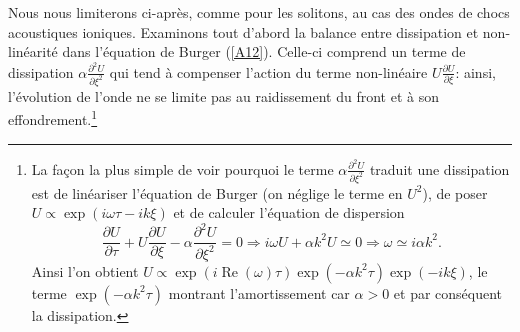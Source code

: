 \documentclass[10pt,thmsa]{article}
\begin{document}
Nous nous limiterons ci-apr\`{e}s, comme pour les solitons, au cas des ondes
de chocs acoustiques ioniques. Examinons tout d'abord la balance entre
dissipation et non-lin\'{e}arit\'{e} dans l'\'{e}quation de Burger
(\ref{A12}). Celle-ci comprend un terme de dissipation $\alpha\frac
{\partial^{2}U}{\partial\xi^{2}}$ qui tend \`{a} compenser l'action du terme
non-lin\'{e}aire $U\frac{\partial U}{\partial\xi}$: ainsi, l'\'{e}volution de
l'onde ne se limite pas au raidissement du front et \`{a} son
effondrement.\footnote{La fa\c{c}on la plus simple de voir pourquoi le terme
$\alpha\frac{\partial^{2}U}{\partial\xi^{2}}$ traduit une dissipation est de
lin\'{e}ariser l'\'{e}quation de Burger (on n\'{e}glige le terme en $U^{2}$),
de poser $U\propto\exp(i\omega\tau-ik\xi)$ et de calculer l'\'{e}quation de
dispersion
\[
\frac{\partial U}{\partial\tau}+U\frac{\partial U}{\partial\xi}-\alpha
\frac{\partial^{2}U}{\partial\xi^{2}}=0\Rightarrow i\omega U+\alpha
k^{2}U\simeq0\Rightarrow\omega\simeq i\alpha k^{2}.
\]
Ainsi l'on obtient $U\propto\exp(i\operatorname{Re}(\omega)\tau)\exp(-\alpha
k^{2}\tau)\exp(-ik\xi)$, le terme $\exp(-\alpha k^{2}\tau)$ montrant
l'amortissement car $\alpha>0$ et par cons\'{e}quent la dissipation.}
\end{document}
